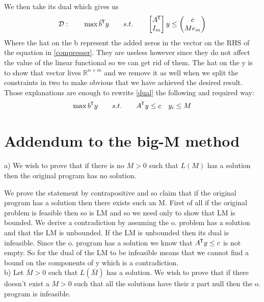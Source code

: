 \documentclass{article}
\newcommand*{\tran}{^{\mkern-1.5mu\mathsf{T}}}%
\begin{document}
	We then take its dual which gives us
	\begin{align}\label{dual}
		\mathcal D : \qquad \max \hat b \tran y \qquad s.t. \qquad 
		\begin{bmatrix} A\tran \\ I_m \end{bmatrix} y \leq 
		\begin{pmatrix} c \\ Me_m \end{pmatrix}
	\end{align}
	Where the hat on the b represent the added zeros in the vector on the RHS of the equation in \ref{compresser}. They are useless however since they do not affect the value of the linear functional so we can get rid of them. The hat on the y is to show that vector lives $\mathbb{R}^{n+m}$ and we remove it as well when we split the constraints in two to make obvious that we have achieved the desired result. Those explanations are enough to rewrite \ref{dual} the following and required way:
	\begin{align}
		\max b\tran y \qquad s.t. \qquad A\tran y \leq c \quad y_i \leq M
	\end{align}
	
	\clearpage
	
	\section{Addendum to the big-M method}
	\vspace{2cm}
	
	a) We wish to prove that if there is no $M>0$ such that $L( M)$ has a solution then the original program has no solution.
	
	 We prove the statement by contrapositive and so claim that if the original program has a solution then there exists such an M. First of all if the original problem is feasible then so is LM and so we need only to show that LM is bounded. We derive a contradiction by assuming the o. problem has a solution and that the LM is unbounded. If the LM is unbounded then its dual is infeasible. Since the o. program has a solution we know that $A\tran y \leq c$ is not empty. So for the dual of the LM to be infeasible means that we cannot find a bound on the components of y which is a contradiction.\\
	 b) Let $\bar M > 0$ such that $L(\bar M)$ has a solution. We wish to prove that if there doesn't exist a $M>0$ such that all the solutions have their z part null then the o. program is infeasible. 
	 
\end{document}
